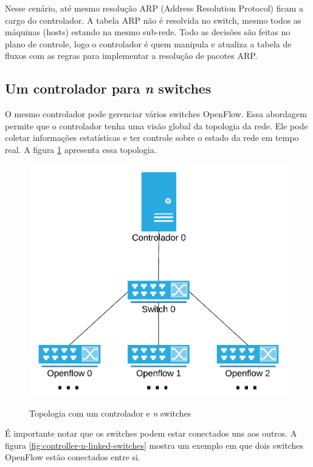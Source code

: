 Nesse cenário, até mesmo resolução ARP (Address Resolution Protocol) ficam
a cargo do controlador. 
A tabela ARP não é resolvida no switch, mesmo todos as máquinas (hosts) 
estando na mesmo sub-rede. 
Todo as decisões são feitas no plano de controle, logo o controlador 
é quem manipula e atualiza a tabela de fluxos com as regras para 
implementar a resolução de pacotes ARP.

\subsection{Um controlador para \emph{n} switches}

O mesmo controlador pode gerenciar vários switches OpenFlow.
Essa abordagem permite que o controlador tenha uma visão global da topologia
da rede.
Ele pode coletar informações estatísticas e ter controle sobre o estado 
da rede em tempo real.
A figura \ref{fig:controller-n-switches} apresenta essa topologia.

\begin{figure}[h!]
    \centering
    \includegraphics[scale=0.85]{img/controller-n-switches}
    \label{fig:controller-n-switches}
    \caption{Topologia com um controlador e \emph{n} switches}
\end{figure}

É importante notar que os switches podem estar conectados uns aos outros.
A figura \ref{fig:controller-n-linked-switches} mostra um exemplo em que 
dois switches OpenFlow estão conectados entre si.

